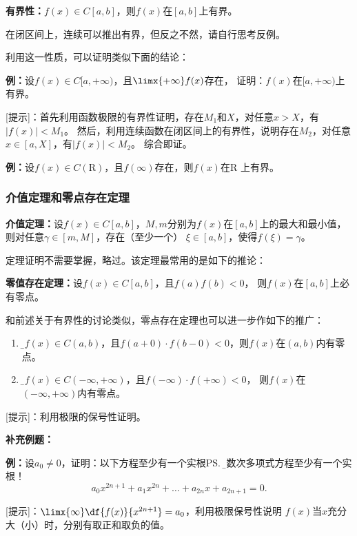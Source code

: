 \begin{thx}
	{\bf 有界性：}$f(x)\in C[a,b]$，则$f(x)$在$[a,b]$上有界。
\end{thx}
在闭区间上，连续可以推出有界，但反之不然，请自行思考反例。

利用这一性质，可以证明类似下面的结论：

{\bf 例：}设$f(x)\in C[a,+\infty)$，且$\limx{+\infty}f(x)$存在，
证明：$f(x)$在$[a,+\infty)$上有界。

[提示]：首先利用函数极限的有界性证明，存在$M_1$和$X$，对任意$x>X$，有$|f(x)|<M_1$。
然后，利用连续函数在闭区间上的有界性，说明存在$M_2$，对任意$x\in[a,X]$，有$|f(x)|<M_2$。
综合即证。

{\bf 例：}设$f(x)\in C(\mathrm{R})$，且$f(\infty)$存在，则$f(x)$在$\mathrm{R}$
上有界。

\subsubsection{介值定理和零点存在定理}

\begin{thx}
	{\bf 介值定理：}设$f(x)\in C[a,b]$，$M,m$分别为$f(x)$在$[a,b]$上的最大和最小值，
	则对任意$\gamma\in[m,M]$，存在（至少一个）
	$\xi\in[a,b]$，使得$f(\xi)=\gamma$。
\end{thx}

定理证明不需要掌握，略过。该定理最常用的是如下的推论：

\begin{thx}
	{\bf 零值存在定理：}设$f(x)\in C[a,b]$，且$f(a)f(b)<0$，
	则$f(x)$在$[a,b]$上必有零点。
\end{thx}

和前述关于有界性的讨论类似，零点存在定理也可以进一步作如下的推广：
\begin{enumerate}[(1)]
  \setlength{\itemindent}{1cm}
  \item {\b 设$f(x)\in C(a,b)$，且$f(a+0)\cdot f(b-0)<0$，则$f(x)$在$(a,b)$内有零点。} 
  \item {\b 设$f(x)\in C(-\infty,+\infty)$，且$f(-\infty)\cdot f(+\infty)<0$，
  则$f(x)$在$(-\infty,+\infty)$内有零点。}
\end{enumerate}

[提示]：利用极限的保号性证明。

{\bf 补充例题：}

{\bf 例：}设$a_0\ne 0$，证明：以下方程至少有一个实根\ps{\b 奇数次多项式方程至少有一个实根！}
$$a_0x^{2n+1}+a_1x^{2n}+\ldots+a_{2n}x+a_{2n+1}=0.$$

[提示]：$\limx{\infty}\df{f(x)}{x^{2n+1}}=a_0$，利用极限保号性说明
$f(x)$当$x$充分大（小）时，分别有取正和取负的值。

